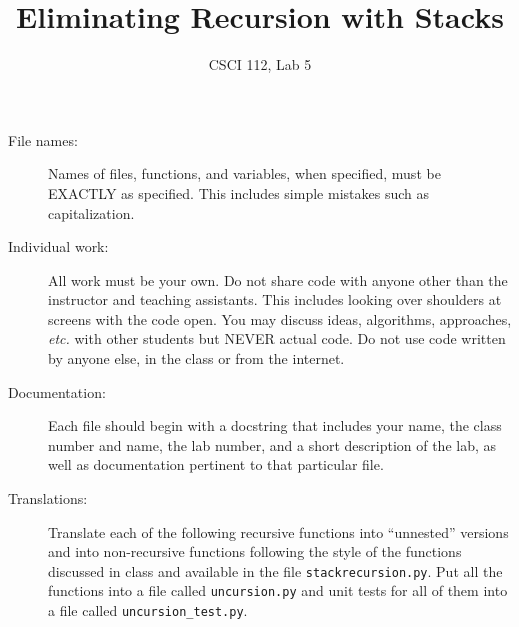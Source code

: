 \documentclass{article}
\title{Eliminating Recursion with Stacks}
\author{CSCI 112, Lab 5}
\date{}
\begin{document}
\sloppy

\maketitle

\begin{description} 
\item[File names:]  Names of files, functions, and variables, 
when specified,
must be EXACTLY as specified.  This includes simple mistakes such
as capitalization.

\item[Individual work:]  All work must be your own.  Do not share
code with anyone other than the instructor and teaching assistants.
This includes looking over shoulders at screens with the code open.
You may discuss ideas, algorithms, approaches, {\em etc.} with
other students but NEVER actual code.  Do not use code
written by anyone else, in the class or from the internet.

\item[Documentation:] Each file should begin with a docstring
that includes your name, the class number and name, the lab
number, and  
a short description of the lab, as well as documentation pertinent
to that particular file.

\item[Translations:]  Translate each of the following
recursive functions into ``unnested'' versions and into
non-recursive functions following
the style of the functions discussed in class and available in the
file \lstinline{stackrecursion.py}.  Put all the functions into
a file called \lstinline{uncursion.py} and unit tests
for all of them into a file called \lstinline{uncursion_test.py}.

\end{description}
\end{document}
